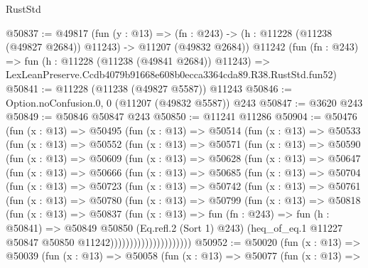 \begin{lexlean}{RustStd}
\begin{coremodule}
@50837 := @49817
    (fun (y : @13) =>
    (fn : @243) -> (h : @11228 (@11238 (@49827 @2684)) @11243) -> @11207 (@49832 @2684))
    @11242
    (fun (fn : @243) =>
    fun (h : @11228 (@11238 (@49841 @2684)) @11243) =>
    LexLeanPreserve.Ccdb4079b91668e608b0ecca3364cda89.R38.RustStd.fun52)
@50841 := @11228 (@11238 (@49827 @5587)) @11243
@50846 := Option.noConfusion.{0, 0} (@11207 (@49832 @5587)) @243
@50847 := @3620 @243
@50849 := @50846 @50847 @243
@50850 := @11241 @11286
@50904 := @50476
    (fun (x : @13) =>
    @50495
      (fun (x : @13) =>
      @50514
        (fun (x : @13) =>
        @50533
          (fun (x : @13) =>
          @50552
            (fun (x : @13) =>
            @50571
              (fun (x : @13) =>
              @50590
                (fun (x : @13) =>
                @50609
                  (fun (x : @13) =>
                  @50628
                    (fun (x : @13) =>
                    @50647
                      (fun (x : @13) =>
                      @50666
                        (fun (x : @13) =>
                        @50685
                          (fun (x : @13) =>
                          @50704
                            (fun (x : @13) =>
                            @50723
                              (fun (x : @13) =>
                              @50742
                                (fun (x : @13) =>
                                @50761
                                  (fun (x : @13) =>
                                  @50780
                                    (fun (x : @13) =>
                                    @50799
                                      (fun (x : @13) =>
                                      @50818
                                        (fun (x : @13) =>
                                        @50837
                                          (fun (x : @13) =>
                                          fun (fn : @243) =>
                                          fun (h : @50841) =>
                                          @50849
                                            @50850
                                            (Eq.refl.{2} (Sort 1) @243)
                                            (heq_of_eq.{1}
                                              @11227
                                              @50847
                                              @50850
                                              @11242)))))))))))))))))))))
@50952 := @50020
    (fun (x : @13) =>
    @50039
      (fun (x : @13) =>
      @50058
        (fun (x : @13) =>
        @50077
          (fun (x : @13) =>

\end{coremodule}
\end{lexlean}
